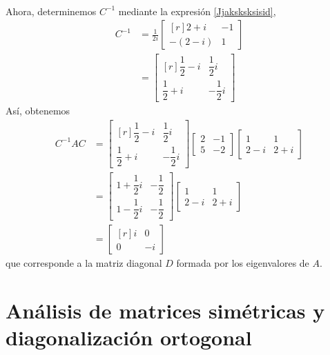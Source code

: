 \begin{example}
\begin{align*}
    \end{align*}
    Ahora, determinemos $C^{-1}$ mediante la expresión \ref{Jjaksksksisid},
    \begin{align*}
        C^{-1} & = \frac{1}{2i} \begin{bmatrix*}[r]
            2 + i & - 1 \\
            -(2 - i) & 1
        \end{bmatrix*} \\
        & = \begin{bmatrix*}[r]
            \dfrac{1}{2} - i & \dfrac{1}{2}i \\[2mm]
            \dfrac{1}{2} + i & - \dfrac{1}{2}i
        \end{bmatrix*}
    \end{align*}
    Así, obtenemos
    \begin{align*}
        C^{-1}AC & = \begin{bmatrix*}[r]
            \dfrac{1}{2} - i & \dfrac{1}{2}i \\[2mm]
            \dfrac{1}{2} + i & - \dfrac{1}{2}i
        \end{bmatrix*} \begin{bmatrix*}
            2 & - 1 \\
            5 & - 2
        \end{bmatrix*} \begin{bmatrix}
            1 & 1 \\
            2 - i & 2 + i
        \end{bmatrix} \\
        & = \begin{bmatrix}
            1 + \dfrac{1}{2}i & - \dfrac{1}{2} \\[2mm]
            1 - \dfrac{1}{2}i & - \dfrac{1}{2}
        \end{bmatrix} \begin{bmatrix}
            1 & 1 \\
            2 - i & 2 + i
        \end{bmatrix} \\
        & = \begin{bmatrix*}[r]
            i & 0 \\
            0 & - i
        \end{bmatrix*}
    \end{align*}
    que corresponde a la matriz diagonal $D$ formada por los eigenvalores de $A$.
\end{example}

\section{Análisis de matrices simétricas y diagonalización ortogonal}\label{sec:matrices_sim_her_uni}


